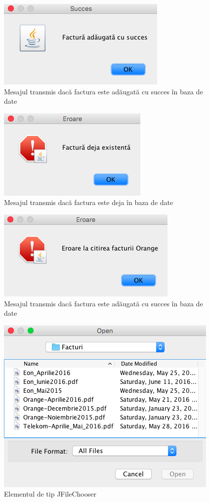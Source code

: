 \documentclass[12pt]{book}
\begin{document}
\begin{figure}[!ht]
	\centering
	\includegraphics{FacturaAdaugataSucces}
	\caption{Mesajul transmis dacă factura este adăugată cu succes în baza de date}
\end{figure}

\begin{figure}[!ht]
	\centering
	\includegraphics{FacturaExistenta}
	\caption{Mesajul transmis dacă factura este deja în baza de date}
\end{figure}

\begin{figure}[!ht]
	\centering
	\includegraphics{EroareCitireaFacturii}
	\caption{Mesajul transmis dacă factura este adăugată cu succes în baza de date}
\end{figure}

\begin{figure}[!ht]
	\centering
	\includegraphics{FileChooser}
	\caption{Elementul de tip JFileChooser}
\end{figure}
\end{document}
